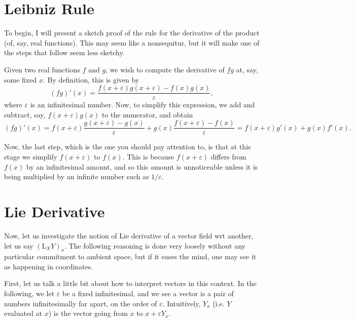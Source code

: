 \documentclass{article}
\theoremstyle{definition}
\newcommand{\Lie}{\mathrm{L}}
\begin{document}
\section{Leibniz Rule}

To begin, I will present a sketch proof of the rule for the derivative of the product (of, say, real functions). This may seem like a nonsequitur, but it will make one of the steps that follow seem less sketchy.

Given two real functions $f$ and $g$, we wish to compute the derivative of $fg$ at, say, some fixed $x$. By definition, this is given by
\begin{equation}
(fg)'(x) = \frac{f(x+\varepsilon) g(x+\varepsilon) - f(x) g(x)}\varepsilon,
\end{equation}
where $\varepsilon$ is an infinitesimal number. Now, to simplify this expression, we add and subtract, say, $f(x+\varepsilon) g(x)$ to the numerator, and obtain
\begin{equation}
(fg)'(x) = f(x+\varepsilon) \frac{g(x+\varepsilon) - g(x)}\varepsilon + g(x) \frac{f(x+\varepsilon) - f(x)}\varepsilon = f(x+\varepsilon) g'(x) + g(x) f'(x).
\end{equation}

Now, the last step, which is the one you should pay attention to, is that at this stage we simplify $f(x+\varepsilon)$ to $f(x)$. This is because $f(x+\varepsilon)$ differs from $f(x)$ by an infinitesimal amount, and so this amount is unnoticeable unless it is being multiplied by an infinite number such as $1/\varepsilon$.

\section{Lie Derivative}

Now, let us investigate the notion of Lie derivative of a vector field wrt another, let us say $(\Lie_X Y)_x$. The following reasoning is done very loosely without any particular commitment to ambient space, but if it eases the mind, one may see it as happening in coordinates.

First, let us talk a little bit about how to interpret vectors in this context. In the following, we let $\varepsilon$ be a fixed infinitesimal, and we see a vector is a pair of numbers infinitesimally far apart, on the order of $\varepsilon$. Intuitively, $Y_x$ (i.e. $Y$ evaluated at $x$) is the vector going from $x$ to $x + \varepsilon Y_x$.
\end{document}
